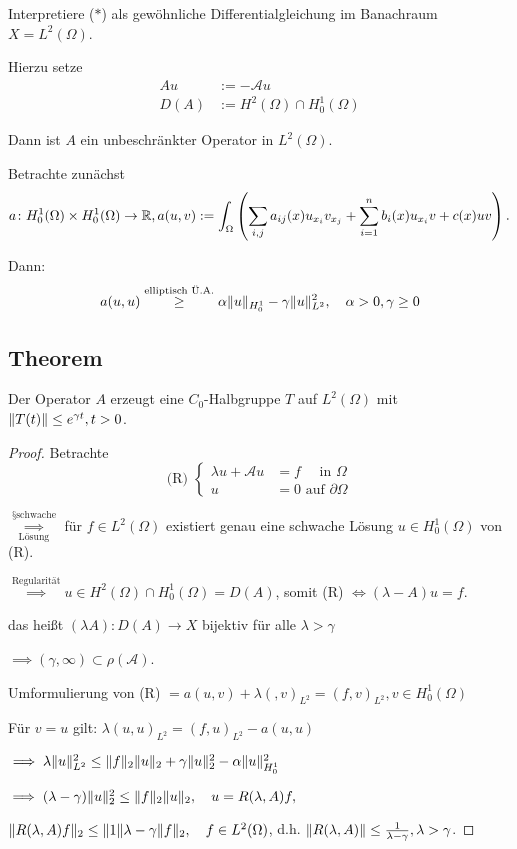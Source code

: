 Interpretiere ($\ast$) als gewöhnliche Differentialgleichung im Banachraum $X = L^2(\Omega)$.

Hierzu setze
\begin{align*}
  A u &:= -\mathcal{A} u \\
  D(A) &:= H^2(\Omega) \cap H_0^1(\Omega)
\end{align*}

Dann ist $A$ ein unbeschränkter Operator in $L^2(\Omega)$.

Betrachte zunächst
$$
  a \colon H_0^1(\Omega) \times H_0^1(\Omega) \to \mathbb{R}, 
  a(u,v) := \int_\Omega \left( \sum_{i,j} a_{ij}(x) u_{x_i} v_{x_j} + \sum_{i = 1}^n b_i(x) u_{x_i} v + c(x) uv \right).
$$

Dann: 
$$
  a(u,u) \overset{\text{elliptisch Ü.A.}}{\geq} \alpha \lVert u \rVert_{H_0^1} - \gamma \lVert u \rVert_{L^2}^2, \quad \alpha > 0, \gamma \geq 0
$$

\subsection{Theorem}

Der Operator $A$ erzeugt eine $C_0$-Halbgruppe $T$ auf $L^2(\Omega)$ mit $\lVert T(t) \rVert \leq e^{\gamma t}, t > 0$.

\begin{proof}
Betrachte
$$
\text{(R) } \begin{cases} \lambda u + \mathcal{A} u &= f \quad\text{ in } \Omega \\ u &= 0 \text{ auf } \partial \Omega \end{cases}
$$

$\overset{§ \text{schwache}}{\underset{\text{Lösung}}{\implies}}$  für $f \in L^2(\Omega)$ existiert genau eine schwache Lösung $u \in H_0^1(\Omega)$ von (R).

$\overset{\text{Regularität}}{\implies} u \in H^2(\Omega) \cap H_0^1(\Omega) = D(A)$, somit (R) $\iff (\lambda - A) u = f$.

das heißt $(\lambda A) \colon D(A) \to X$ bijektiv für alle $\lambda > \gamma$

$\implies (\gamma, \infty) \subset \rho(\mathcal{A})$.

Umformulierung von (R) $= a(u,v) + \lambda (,v)_{L^2} = (f, v)_{L^2}, v \in H_0^1(\Omega)$

Für $v = u$ gilt: $\lambda(u,u)_{L^2} = (f, u)_{L^2} - a(u,u)$

$\implies \lambda \lVert u \rVert_{L^2}^2 \leq \lVert f \rVert_2 \lVert u \rVert_2 + \gamma \lVert u \rVert_2^2 - \alpha \lVert u \rVert_{H_0^1}^2$

$\implies (\lambda - \gamma) \lVert u \rVert_2^2 \leq \lVert f \rVert_2 \lVert u \rVert_2, \quad u = R(\lambda, A) f,$

$\lVert R(\lambda, A) f \rVert_2 \leq \lVert 1 \rVert{\lambda - \gamma } \lVert f \rVert_2, \quad f \in L^2(\Omega)$, d.h. $\lVert R(\lambda, A) \rVert \leq \frac{1}{\lambda - \gamma}, \lambda > \gamma$.
\end{proof}

